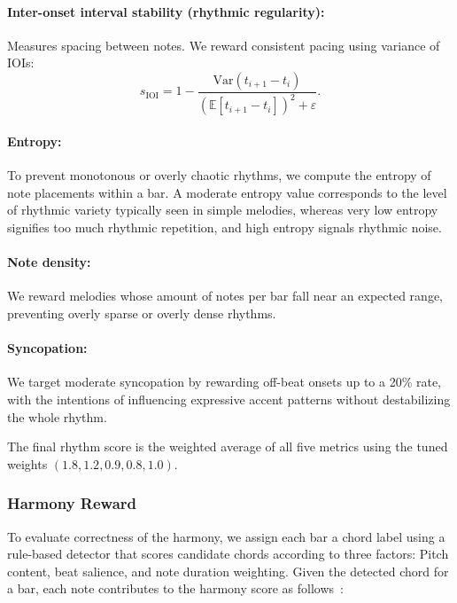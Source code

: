 \documentclass{article}
\begin{document}
\paragraph{Inter-onset interval stability (rhythmic regularity):}
Measures spacing between notes. We reward consistent pacing using
variance of IOIs:
\vspace{-4pt}
\[
s_{\text{IOI}} = 1 - \frac{\mathrm{Var}(t_{i+1}-t_i)}{(\mathbb{E}[t_{i+1}-t_i])^2 + \varepsilon}.
\]

\paragraph{Entropy:}
To prevent monotonous or overly chaotic rhythms, we compute the entropy of note placements within a bar. A moderate entropy value corresponds to the level of rhythmic variety typically seen in simple melodies, whereas very low entropy signifies too much rhythmic repetition, and high entropy signals rhythmic noise.

\paragraph{Note density:}
We reward melodies whose amount of notes per bar fall near an expected range, preventing overly sparse or overly
dense rhythms.

\paragraph{Syncopation:}
We target moderate syncopation by rewarding off-beat onsets up to a 20\% rate, with the intentions of influencing expressive accent patterns without destabilizing the whole rhythm.

The final rhythm score is the weighted average of all five metrics using the tuned weights
$(1.8, 1.2, 0.9, 0.8, 1.0)$.

\subsubsection{Harmony Reward}

To evaluate correctness of the harmony, we assign each bar a chord label using a rule-based detector that 
scores candidate chords according to three factors: Pitch content, beat salience, and note duration weighting. Given the detected chord for a bar, each note contributes to the harmony score as follows~\citep{piston2011harmony}:
\end{document}

